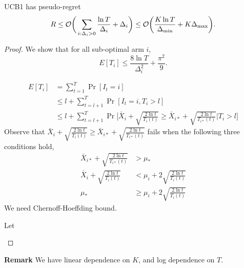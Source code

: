\begin{thm}
    UCB1 has pseudo-regret
    \begin{equation}
        R \le \mathcal{O}\bigg(\sum_{i:\Delta_i>0} \frac{\ln T}{\Delta_i}+\Delta_i\bigg)
            \le \mathcal{O}\bigg(\frac{K\ln T}{\Delta_\text{min}}+K\Delta_\text{max}\bigg).
    \end{equation}
\end{thm}
\begin{proof}
    We show that for all sub-optimal arm $i$,
    \begin{equation}
        E[T_i] \le \frac{8\ln T}{\Delta_i^2} + \frac{\pi^2}{9}.
    \end{equation}

    \begin{align}
        E[T_i]
            &= \sum_{t=1}^T \Pr[I_t=i] \\
            &\le l + \sum_{t=l+1}^T \Pr[I_t=i, T_i>l] \\
            &\le l + \sum_{t=l+1}^T \Pr\bigg[\bar X_i + \sqrt{\frac{2\ln t}{T_i(t)}}\ge \bar X_{i*}+\sqrt{\frac{2\ln t}{T_{i*}(t)}}\bigg|T_i>l\bigg]
    \end{align}
    Observe that $\bar X_i + \sqrt{\frac{2\ln t}{T_i(t)}}\ge \bar X_{i*}+\sqrt{\frac{2\ln t}{T_{i*}(t)}}$
    fails when the following three conditions hold,
    \begin{align}
        \bar X_{i*} + \sqrt{\frac{2\ln t}{T_{i*}(t)}} &> \mu_*  \\
        \bar X_{i} + \sqrt{\frac{2\ln t}{T_{i}(t)}} &< \mu_i + 2\sqrt{\frac{2\ln t}{T_{i}(t)}} \\
        \mu_* &\ge \mu_i + 2\sqrt{\frac{2\ln t}{T_{i}(t)}}
    \end{align}
    We need Chernoff-Hoeffding bound.
    \begin{framed}
        \begin{fact}
            Let
        \end{fact}
    \end{framed}
\end{proof}

\textbf{Remark}
We have linear dependence on $K$,
and log dependence on $T$.
